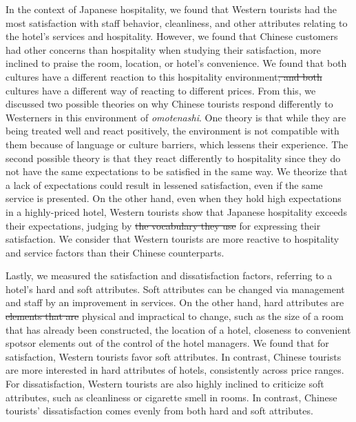 \documentclass[smallextended,natbib]{svjour3}       %
\providecommand{\DIFadd}[1]{{\protect\color{blue}\uwave{#1}}} %
\providecommand{\DIFdel}[1]{{\protect\color{red}\sout{#1}}}                      %
\providecommand{\DIFaddbegin}{} %
\providecommand{\DIFaddend}{} %
\providecommand{\DIFdelbegin}{} %
\providecommand{\DIFdelend}{} %
\newcommand{\DIFscaledelfig}{0.5}
\newlength{\DIFdelgraphicswidth} %
\newlength{\DIFdelgraphicsheight} %
\newcommand{\DIFaddincludegraphics}[2][]{{\color{blue}\fbox{\DIFOincludegraphics[#1]{#2}}}} %
\newcommand{\DIFdelincludegraphics}[2][]{%
\sbox{\DIFdelgraphicsbox}{\DIFOincludegraphics[#1]{#2}}%
\settoboxwidth{\DIFdelgraphicswidth}{\DIFdelgraphicsbox} %
\settoboxtotalheight{\DIFdelgraphicsheight}{\DIFdelgraphicsbox} %
\scalebox{\DIFscaledelfig}{%
\parbox[b]{\DIFdelgraphicswidth}{\usebox{\DIFdelgraphicsbox}\\[-\baselineskip] \rule{\DIFdelgraphicswidth}{0em}}\llap{\resizebox{\DIFdelgraphicswidth}{\DIFdelgraphicsheight}{%
\setlength{\unitlength}{\DIFdelgraphicswidth}%
\begin{picture}(1,1)%
\thicklines\linethickness{2pt} %
{\color[rgb]{1,0,0}\put(0,0){\framebox(1,1){}}}%
{\color[rgb]{1,0,0}\put(0,0){\line( 1,1){1}}}%
{\color[rgb]{1,0,0}\put(0,1){\line(1,-1){1}}}%
\end{picture}%
}\hspace*{3pt}}} %
} %
\DeclareRobustCommand{\DIFaddbegin}{\DIFOaddbegin \let\includegraphics\DIFaddincludegraphics} %
\DeclareRobustCommand{\DIFaddend}{\DIFOaddend \let\includegraphics\DIFOincludegraphics} %
\DeclareRobustCommand{\DIFdelbegin}{\DIFOdelbegin \let\includegraphics\DIFdelincludegraphics} %
\DeclareRobustCommand{\DIFdelend}{\DIFOaddend \let\includegraphics\DIFOincludegraphics} %
\begin{document}
  In the context of Japanese hospitality, we found that Western tourists had the most satisfaction with staff behavior, cleanliness, and other attributes relating to the hotel's services and hospitality. However, we found that Chinese customers had other concerns than hospitality when studying their satisfaction, more inclined to praise the room, location, or hotel's convenience. We found that both cultures have a different reaction to this hospitality environment\DIFdelbegin \DIFdel{, and both }\DIFdelend \DIFaddbegin \DIFadd{. Both }\DIFaddend cultures have a different way of reacting to different prices. From this, we discussed two possible theories on why Chinese tourists respond differently to Westerners in this environment of \textit{omotenashi}. One theory is that while they are being treated well and react positively, the environment is not compatible with them because of language or culture barriers, which lessens their experience. The second possible theory is that they react differently to hospitality since they do not have the same expectations to be satisfied in the same way. We theorize that a lack of expectations could result in lessened satisfaction, even if the same service is presented. On the other hand, even when they hold high expectations in a highly-priced hotel, Western tourists show that Japanese hospitality exceeds their expectations, judging by \DIFdelbegin \DIFdel{the vocabulary they use }\DIFdelend \DIFaddbegin \DIFadd{their vocabulary }\DIFaddend for expressing their satisfaction. We consider that Western tourists are more reactive to hospitality and service factors than their Chinese counterparts.

  Lastly, we measured the satisfaction and dissatisfaction factors, referring to a hotel's hard and soft attributes. Soft attributes can be changed via management and staff by an improvement in services. On the other hand, hard attributes are \DIFdelbegin \DIFdel{elements that are }\DIFdelend physical and impractical \DIFaddbegin \DIFadd{elements }\DIFaddend to change, such as the size of a room that has already been constructed, the location of a hotel, closeness to convenient spots\DIFaddbegin \DIFadd{, }\DIFaddend or elements out of the control of the hotel managers. We found that for satisfaction, Western tourists favor soft attributes. In contrast, Chinese tourists are more interested in \DIFaddbegin \DIFadd{the }\DIFaddend hard attributes of hotels, consistently across price ranges. For dissatisfaction, Western tourists are also highly inclined to criticize soft attributes, such as cleanliness or cigarette smell in rooms. In contrast, Chinese tourists' dissatisfaction comes evenly from both hard and soft attributes.
\end{document}
